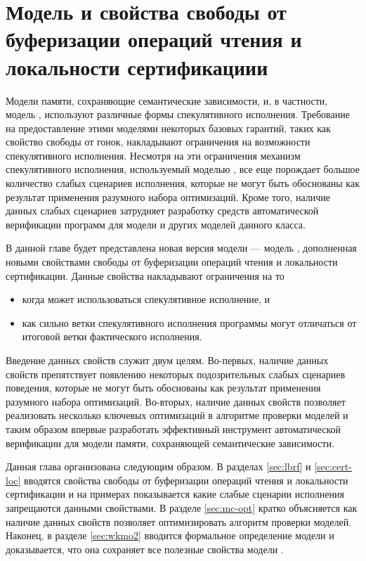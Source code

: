 \chapter{Модель \WkmS и свойства свободы от буферизации операций чтения и локальности сертификациии}
\label{ch:weakestmo2}

Модели памяти, сохраняющие семантические зависимости,
и, в частности, модель \Wkm, используют различные формы
спекулятивного исполнения.
Требование на предоставление этими моделями некоторых базовых гарантий,
таких как свойство свободы от гонок, накладывают
ограничения на возможности спекулятивного исполнения.
Несмотря на эти ограничения механизм спекулятивного исполнения,
используемый моделью \Wkm, все еще порождает большое количество
слабых сценариев исполнения,
которые не могут быть обоснованы как результат применения
разумного набора оптимизаций.
Кроме того, наличие данных слабых сценариев
затрудняет разработку средств автоматической верификации
программ для модели \Wkm и других моделей данного класса. 

В данной главе будет представлена новая версия модели \Wkm ---
модель \WkmS, дополненная новыми свойствами
свободы от буферизации операций чтения и локальности сертификации.
Данные свойства накладывают ограничения на то
\begin{itemize}
  \item когда может использоваться спекулятивное исполнение, и
  \item как сильно ветки спекулятивного исполнения программы 
    могут отличаться от итоговой ветки фактического исполнения. 
\end{itemize}
Введение данных свойств служит двум целям. 
Во-первых, наличие данных свойств препятствует появлению 
некоторых подозрительных слабых сценариев поведения, 
которые не могут быть обоснованы как результат применения
разумного набора оптимизаций. 
Во-вторых, наличие данных свойств позволяет реализовать 
несколько ключевых оптимизаций в алгоритме проверки моделей 
и таким образом впервые разработать эффективный инструмент
автоматической верификации для модели памяти,
сохраняющей семантические зависимости. 

Данная глава организована следующим образом. 
В разделах \ref{sec:lbrf} и \ref{sec:cert-loc}
вводятся свойства свободы от буферизации операций чтения 
и локальности сертификации и на примерах показывается 
какие слабые сценарии исполнения запрещаются данными свойствами. 
В разделе \ref{sec:mc-opt} кратко объясняется как 
наличие данных свойств позволяет оптимизировать 
алгоритм проверки моделей. 
Наконец, в разделе \ref{sec:wkmo2} вводится 
формальное определение модели \WkmS 
и доказывается, что она сохраняет все полезные свойства модели \Wkm.

